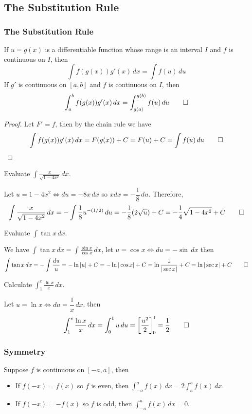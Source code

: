 \subsection{The Substitution Rule}
\subsubsection{The Substitution Rule}
\begin{theorem}
    If \(u=g(x)\) is a differentiable function whose range is an interval
    \(I\) and \(f\) is continuous on \(I\), then
    \[\int f(g(x))g'(x)\,dx=\int f(u)\,du\]
    If \(g'\) is continuous on \([a,b]\) and \(f\) is continuous on \(I\),
    then
    \[\int_a^b f(g(x))g'(x)\,dx=\int_{g(a)}^{g(b)} f(u)\,du\qedhere\]
\end{theorem}
\begin{proof}
    Let \(F'=f\), then by the chain rule we have
    \[\int f(g(x))g'(x)\,dx=F(g(x))+C=F(u)+C=\int f(u)\,du\qedhere\]
\end{proof}
\begin{problem}
    Evaluate \(\displaystyle{\int\frac{x}{\sqrt{1-4x^2}}\,dx}\).
\end{problem}
\begin{solution}
    Let \(u=1-4x^2\iff du=-8x\,dx\) so \(xdx=-\dfrac{1}{8}\,du\).
    Therefore,
    \[\int\frac{x}{\sqrt{1-4x^2}}\,dx=-\int\frac{1}{8}u^{-(1/2)}\,du
    =-\frac{1}{8}(2\sqrt{u})+C=-\frac{1}{4}\sqrt{1-4x^2}+C\qedhere\]
\end{solution}
\begin{problem}
    Evaluate \(\displaystyle{\int\tan x\,dx}\).
\end{problem}
\begin{solution}
    We have \(\displaystyle{\int\tan x\,dx=\int\frac{\sin x}{\cos x}}\,dx\),
    let \(u=\cos x \iff du=-\sin\,dx\) then
    \[\int\tan x\,dx=-\int\frac{du}{u}=-\ln|u|+C=-\ln|\cos x|+C
    =\ln\frac{1}{|\sec x|}+C=\ln|\sec x|+C\qedhere\]
\end{solution}
\begin{problem}
    Calculate \(\displaystyle{\int_1^e \frac{\ln x}{x}\,dx}\).
\end{problem}
\begin{solution}
    Let \(u=\ln x\iff du=\dfrac{1}{x}\,dx\), then
    \[\int_1^e \frac{\ln x}{x}\,dx=\int_0^1 u\,du
    =\left[\frac{u^2}{2}\right]_0^1=\frac{1}{2}\qedhere\]
\end{solution}

\subsubsection{Symmetry}
\begin{theorem}
    Suppose \(f\) is continuous on \([-a,a]\), then
    \begin{itemize}
        \item If \(f(-x)=f(x)\) so \(f\) is even, then
        \(\displaystyle{\int_{-a}^a f(x)\,dx=2\int_a^a f(x)\,dx}\).
        \item If \(f(-x)=-f(x)\) so \(f\) is odd, then
        \(\displaystyle{\int_{-a}^a f(x)\,dx=0}\).\qedhere
    \end{itemize}
\end{theorem}